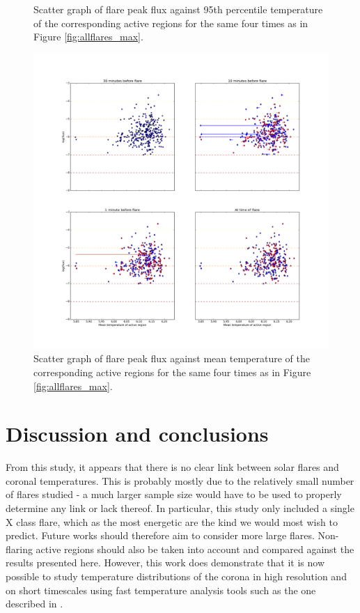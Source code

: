 \documentclass[referee,a4paper,12pt]{swsc}
\begin{document}
\begin{linenumbers}
\begin{figure}
	\caption{Scatter graph of flare peak flux against 95th percentile temperature of the corresponding active regions for the same four times as in Figure \ref{fig:allflares_max}.}
	\label{fig:allflares_p95}
\end{figure}
\begin{figure}
	\centering
		\includegraphics[width=0.9\columnwidth]{tempplotsmean/allflares.png}
	\caption{Scatter graph of flare peak flux against mean temperature of the corresponding active regions for the same four times as in Figure \ref{fig:allflares_max}.}
	\label{fig:allflares_mean}
\end{figure}

\section{Discussion and conclusions}
From this study, it appears that there is no clear link between solar flares and coronal temperatures.
This is probably mostly due to the relatively small number of flares studied - a much larger sample size would have to be used to properly determine any link or lack thereof.
In particular, this study only included a single X class flare, which as the most energetic are the kind we would most wish to predict.
Future works should therefore aim to consider more large flares.
Non-flaring active regions should also be taken into account and compared against the results presented here.
However, this work does demonstrate that it is now possible to study temperature distributions of the corona in high resolution and on short timescales using fast temperature analysis tools such as the one described in .


\end{linenumbers}
\end{document}

